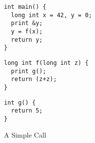 \begin{figure}[b]
    \begin{minipage}{.35\textwidth}
\begin{verbatim}
int main() {
  long int x = 42, y = 0;
  print &y;
  y = f(x);
  return y;
}
\end{verbatim}
    \end{minipage}
    \begin{minipage}{.35\textwidth}
\begin{verbatim}
long int f(long int z) {
  print g();
  return (z+z);
}
\end{verbatim}
    \end{minipage}
    \begin{minipage}{.25\textwidth}
\begin{verbatim}
int g() {
  return 5;
}
\end{verbatim}
    \end{minipage}
\caption{A Simple Call}
\label{fig:share-program}
\end{figure}

\newcommand{\mainpassc}{magenta}
\newcommand{\sharec}{lgray}

